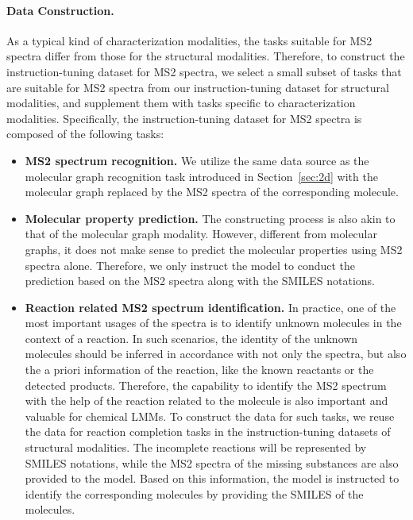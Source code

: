 \paragraph{Data Construction.} As a typical kind of characterization modalities, the tasks suitable for MS2 spectra differ from those for the structural modalities. Therefore, to construct the instruction-tuning dataset for MS2 spectra, we select a small subset of tasks that are suitable for MS2 spectra from our instruction-tuning dataset for structural modalities, and supplement them with tasks specific to characterization modalities. Specifically, the instruction-tuning dataset for MS2 spectra is composed of the following tasks:
\begin{itemize}
    \item \textbf{MS2 spectrum recognition.} We utilize the same data source as the molecular graph recognition task introduced in Section~\ref{sec:2d} with the molecular graph replaced by the MS2 spectra of the corresponding molecule.
    \item \textbf{Molecular property prediction.} The constructing process is also akin to that of the molecular graph modality. However, different from molecular graphs, it does not make sense to predict the molecular properties using MS2 spectra alone. Therefore, we only instruct the model to conduct the prediction based on the MS2 spectra along with the SMILES notations.
    \item \textbf{Reaction related MS2 spectrum identification.} In practice, one of the most important usages of the spectra is to identify unknown molecules in the context of a reaction. 
    In such scenarios, the identity of the unknown molecules should be inferred in accordance with not only the spectra, but also the a priori information of the reaction, like the known reactants or the detected products.
    Therefore, the capability to identify the MS2 spectrum with the help of the reaction related to the molecule is also important and valuable for chemical LMMs. To construct the data for such tasks, we reuse the data for reaction completion tasks in the instruction-tuning datasets of structural modalities. The incomplete reactions will be represented by SMILES notations, while the MS2 spectra of the missing substances are also provided to the model. Based on this information, the model is instructed to identify the corresponding molecules by providing the SMILES of the molecules.
\end{itemize}

